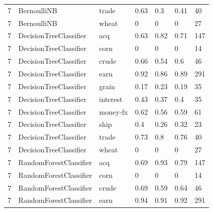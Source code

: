 \documentclass{article}
\begin{document}
\begin{table}[h]
\begin{tabular}{lllllll}
7             & BernoulliNB            & trade           & 0.63               & 0.3             & 0.41              & 40               \\
7             & BernoulliNB            & wheat           & 0                  & 0               & 0                 & 27               \\
7             & DecisionTreeClassifier & acq             & 0.63               & 0.82            & 0.71              & 147              \\
7             & DecisionTreeClassifier & corn            & 0                  & 0               & 0                 & 14               \\
7             & DecisionTreeClassifier & crude           & 0.66               & 0.54            & 0.6               & 46               \\
7             & DecisionTreeClassifier & earn            & 0.92               & 0.86            & 0.89              & 291              \\
7             & DecisionTreeClassifier & grain           & 0.17               & 0.23            & 0.19              & 35               \\
7             & DecisionTreeClassifier & interest        & 0.43               & 0.37            & 0.4               & 35               \\
7             & DecisionTreeClassifier & money-fx        & 0.62               & 0.56            & 0.59              & 61               \\
7             & DecisionTreeClassifier & ship            & 0.4                & 0.26            & 0.32              & 23               \\
7             & DecisionTreeClassifier & trade           & 0.73               & 0.8             & 0.76              & 40               \\
7             & DecisionTreeClassifier & wheat           & 0                  & 0               & 0                 & 27               \\
7             & RandomForestClassifier & acq             & 0.69               & 0.93            & 0.79              & 147              \\
7             & RandomForestClassifier & corn            & 0                  & 0               & 0                 & 14               \\
7             & RandomForestClassifier & crude           & 0.69               & 0.59            & 0.64              & 46               \\
7             & RandomForestClassifier & earn            & 0.94               & 0.91            & 0.92              & 291              \\\end{tabular}
\end{table}
\end{document}
